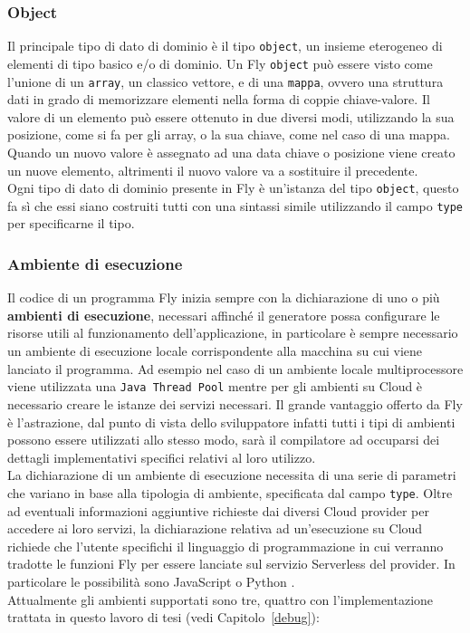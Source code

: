 \subsubsection{Object} 
Il principale tipo di dato di dominio è il tipo \verb|object|, un insieme eterogeneo di elementi di tipo basico e/o di dominio. Un Fly \verb|object| può essere visto come l'unione di un \verb|array|, un classico vettore, e di una \verb|mappa|, ovvero una struttura dati in grado di memorizzare elementi nella forma di coppie chiave-valore. Il valore di un elemento può essere ottenuto in due diversi modi, utilizzando la sua posizione, come si fa per gli array, o la sua chiave, come nel caso di una mappa. Quando un nuovo valore è assegnato ad una data chiave o posizione viene creato un nuove elemento, altrimenti il nuovo valore va a sostituire il precedente. \\
Ogni tipo di dato di dominio presente in Fly è un'istanza del tipo \verb|object|, questo fa sì che essi siano costruiti tutti con una sintassi simile utilizzando il campo \verb|type| per specificarne il tipo.

\subsubsection{Ambiente di esecuzione}
Il codice di un programma Fly inizia sempre con la dichiarazione di uno o più \textbf{ambienti di esecuzione}, necessari affinché il generatore possa configurare le risorse utili al funzionamento dell'applicazione, in particolare è sempre necessario un ambiente di esecuzione locale corrispondente alla macchina su cui viene lanciato il programma. Ad esempio nel caso di un ambiente locale multiprocessore viene utilizzata una \verb|Java Thread Pool| mentre per gli ambienti su Cloud è necessario creare le istanze dei servizi necessari. Il grande vantaggio offerto da Fly è l'astrazione, dal punto di vista dello sviluppatore infatti tutti i tipi di ambienti possono essere utilizzati allo stesso modo, sarà il compilatore ad occuparsi dei dettagli implementativi specifici relativi al loro utilizzo. \\
La dichiarazione di un ambiente di esecuzione necessita di una serie di parametri che variano in base alla tipologia di ambiente, specificata dal campo \verb|type|. Oltre ad eventuali informazioni aggiuntive richieste dai diversi Cloud provider per accedere ai loro servizi, la dichiarazione relativa ad un'esecuzione su Cloud richiede che l'utente specifichi il linguaggio di programmazione in cui verranno tradotte le funzioni Fly per essere lanciate sul servizio Serverless del provider. In particolare le possibilità sono JavaScript \cite{JavaScriptSite} o Python \cite{PythonSite}.\\
Attualmente gli ambienti supportati sono tre, quattro con l'implementazione trattata in questo lavoro di tesi (vedi Capitolo~\ref{debug}):

